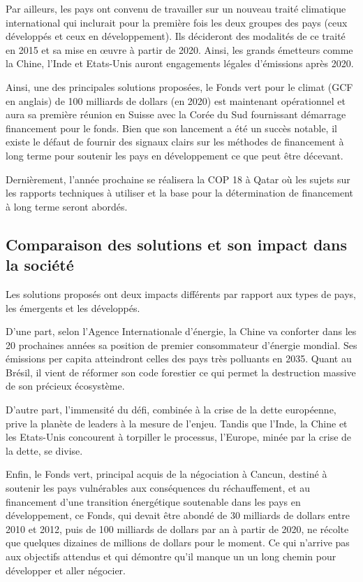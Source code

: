 \documentclass[a4paper,11pt]{article}
\begin{document}
Par  ailleurs,  les  pays  ont  convenu  de travailler  sur  un  nouveau  traité
climatique international  qui inclurait pour  la première fois les  deux groupes
des  pays  (ceux  développés  et  ceux en  développement).  Ils  décideront  des
modalités de ce traité en 2015 et sa  mise en œuvre à partir de 2020. Ainsi, les
grands émetteurs comme la Chine, l'Inde et Etats-Unis auront engagements légales
d'émissions après 2020. 


Ainsi, une  des principales  solutions proposées, le  Fonds vert pour  le climat
(GCF  en  anglais)  de  100  milliards  de  dollars  (en  2020)  est  maintenant
opérationnel  et  aura sa  première  réunion  en Suisse  avec  la  Corée du  Sud
fournissant démarrage financement pour le fonds. Bien que son lancement a été un
succès  notable, il  existe le  défaut  de fournir  des signaux  clairs sur  les
méthodes de financement à long terme  pour soutenir les pays en développement ce
que peut être décevant. 


Dernièrement, l’année prochaine se réalisera la COP 18 à Qatar où les sujets sur
les  rapports  techniques  à  utiliser  et  la base  pour  la  détermination  de
financement à long terme seront abordés.


\subsection{Comparaison des solutions et son impact dans la société}

Les solutions proposés ont deux impacts différents par rapport aux types de pays, les émergents et les développés.

D’une part, selon l'Agence Internationale  d'énergie, la Chine va conforter dans
les  20  prochaines  années   sa  position  de  premier  consommateur  d'énergie
mondial. Ses émissions per capita  atteindront celles des pays très polluants en
2035. Quant au Brésil, il vient de  réformer son code forestier ce qui permet la
destruction massive de son précieux écosystème. 


D’autre part, l'immensité  du défi, combinée à la crise  de la dette européenne,
prive la planète de leaders à la  mesure de l'enjeu. Tandis que l'Inde, la Chine
et les  Etats-Unis concourent à torpiller  le processus, l'Europe,  minée par la
crise de la dette, se divise. 


Enfin, le  Fonds vert, principal  acquis de la  négociation à Cancun,  destiné à
soutenir  les  pays  vulnérables   aux  conséquences  du  réchauffement,  et  au
financement   d'une  transition   énergétique  soutenable   dans  les   pays  en
développement, ce Fonds, qui devait être abondé de 30 milliards de dollars entre
2010 et  2012, puis  de 100 milliards  de dollars  par an à  partir de  2020, ne
récolte que  quelques dizaines  de millions  de dollars pour  le moment.  Ce qui
n’arrive pas  aux objectifs  attendus et  qui démontre qu’il  manque un  un long
chemin pour développer et aller négocier.
\end{document}
